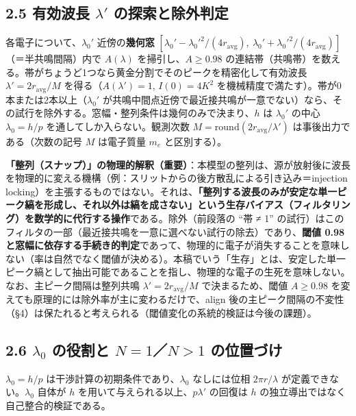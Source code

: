 \documentclass[11pt,a4paper]{ltjsarticle}
\begin{document}
\subsection{\texorpdfstring{2.5 有効波長 \(\lambda'\)
の探索と除外判定}{2.5 有効波長 \textbackslash lambda\textquotesingle{} の探索と除外判定}}\label{ux6709ux52b9ux6ce2ux9577-lambda-ux306eux63a2ux7d22ux3068ux9664ux5916ux5224ux5b9a}

各電子について、\(\lambda_0'\) 近傍の\textbf{幾何窓}
\([\lambda_0'-\lambda_0'^2/(4r_{\mathrm{avg}}),\ \lambda_0'+\lambda_0'^2/(4r_{\mathrm{avg}})]\)（＝半共鳴間隔）内で
\(A(\lambda)\) を掃引し、\(A\ge0.98\)
の連結帯（共鳴帯）を数える。帯がちょうど1つなら黄金分割でそのピークを精密化して有効波長
\(\lambda'=2r_{\mathrm{avg}}/M\) を得る（\(A(\lambda')=1\),
\(I(0)=4K^2\) を機械精度で満たす）。帯が0本または2本以上（\(\lambda_0'\)
が共鳴中間点近傍で最近接共鳴が一意でない）なら、その試行を除外する。窓幅・整列条件は幾何のみで決まり、\(h\)
は \(\lambda_0'\) の中心 \(\lambda_0=h/p\)
を通してしか入らない。観測次数
\(M=\mathrm{round}(2r_{\mathrm{avg}}/\lambda')\)
は事後出力である（次数の記号 \(M\) は電子質量 \(m_e\) と区別する）。

\textbf{「整列（スナップ）」の物理的解釈（重要）}：本模型の整列は、源が放射後に波長を物理的に変える機構（例：スリットからの後方散乱による引き込み＝injection
locking）を主張するものではない。それは、\textbf{「整列する波長のみが安定な単一ピーク縞を形成し、それ以外は縞を成さない」という生存バイアス（フィルタリング）を数学的に代行する操作}である。除外（前段落の
``帯 ≠ 1''
の試行）はこのフィルタの一部（最近接共鳴を一意に選べない試行の除去）であり、\textbf{閾値
0.98
と窓幅に依存する手続き的判定}であって、物理的に電子が消失することを意味しない（率は自然でなく閾値が決める）。本稿でいう「生存」とは、安定した単一ピーク縞として抽出可能であることを指し、物理的な電子の生死を意味しない。なお、主ピーク間隔は整列共鳴
\(\lambda'=2r_{\mathrm{avg}}/M\) で決まるため、閾値 \(A\ge0.98\)
を変えても原理的には除外率が主に変わるだけで、align
後の主ピーク間隔の不変性（§4）は保たれると考えられる（閾値変化の系統的検証は今後の課題）。

\subsection{\texorpdfstring{2.6 \(\lambda_0\) の役割と \(N=1\)／\(N>1\)
の位置づけ}{2.6 \textbackslash lambda\_0 の役割と N=1／N\textgreater1 の位置づけ}}\label{lambda_0-ux306eux5f79ux5272ux3068-n1n1-ux306eux4f4dux7f6eux3065ux3051}

\(\lambda_0=h/p\) は干渉計算の初期条件であり、\(\lambda_0\) なしには位相
\(2\pi r/\lambda\) が定義できない。\(\lambda_0\) 自体が \(h\)
を用いて与えられる以上、\(p\lambda'\) の回復は \(h\)
の独立導出ではなく自己整合的検証である。
\end{document}
